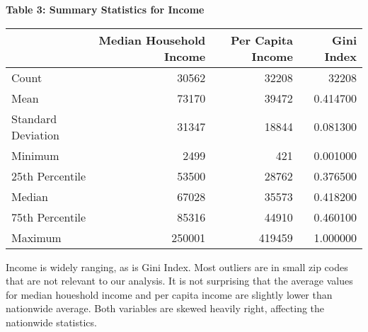 \documentclass[11pt]{article}
\begin{document}
\begin{table}[H]
    \centering
    \textbf{Table 3: Summary Statistics for Income}
    \begin{tabular}{l|rrr}
    \toprule
     & Median Household Income & Per Capita Income & Gini Index \\\midrule
    Count & 30562 & 32208 & 32208 \\
    Mean & 73170 & 39472 & 0.414700 \\
    Standard Deviation & 31347 & 18844 & 0.081300 \\
    Minimum & 2499 & 421 & 0.001000 \\
    25th Percentile & 53500 & 28762 & 0.376500 \\
    Median & 67028 & 35573 & 0.418200 \\
    75th Percentile & 85316 & 44910 & 0.460100 \\
    Maximum & 250001 & 419459 & 1.000000 \\\bottomrule
    \end{tabular}
\end{table}
Income is widely ranging, as is Gini Index. Most outliers are in small zip codes that are not relevant to our analysis. It is not surprising that the average values for median houeshold income and per capita income are slightly lower than nationwide average. Both variables are skewed heavily right, affecting the nationwide statistics.
\end{document}
